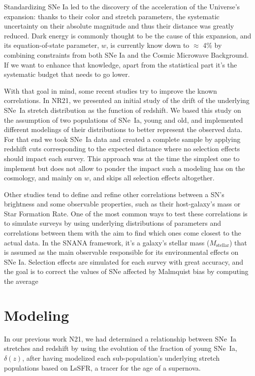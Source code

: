\documentclass[]{aa}
\begin{document}
Standardizing SNe Ia led to the discovery of the acceleration of the Universe's
expansion: thanks to their color and stretch parameters, the systematic
uncertainty on their absolute magnitude and thus their distance was greatly
reduced. Dark energy is commonly thought to be the cause of this expansion, and
its equation-of-state parameter, $w$, is currently know down to $\approx$ 4\% by
combining constraints from both SNe Ia and the Cosmic Microwave Background. If
we want to enhance that knowledge, apart from the statistical part it's the
systematic budget that needs to go lower.

With that goal in mind, some recent studies try to improve the known
correlations. In NR21, we presented an initial study of the drift of the
underlying SNe~Ia stretch distribution as the function of redshift. We based
this study on the assumption of two populations of SNe~Ia, young and old, and
implemented different modelings of their distributions to better represent the
observed data. For that end we took SNe~Ia data and created a complete sample by
applying redshift cuts corresponding to the expected distance where no selection
effects should impact each survey. This approach was at the time the
simplest one to implement but does not allow to ponder the impact such a
modeling has on the cosmology, and mainly on $w$, and skips all selection
effects altogether.

Other studies tend to define and refine other correlations between a SN's
brightness and some observable properties, such as their host-galaxy's mass or
Star Formation Rate. One of the most common ways to test these correlations is
to simulate surveys by using underlying distributions of parameters and
correlations between them with the aim to find which ones come closest to the
actual data. In the SNANA framework, it's a galaxy's stellar mass
($M_\mathrm{stellar}$) that is assumed as the main observable responsible for
its environmental effects on SNe Ia. Selection effects are simulated for each
survey with great accuracy, and the goal is to correct the values of SNe
affected by Malmquist bias by computing the average

\section{Modeling}\label{sec:model}
In our previous work N21, we had determined a relationship between SNe~Ia
stretches and redshift by using the evolution of the fraction of young SNe~Ia,
$\delta(z)$, after having modelized each sub-population's underlying stretch
populations based on LsSFR, a tracer for the age of a supernova.
\end{document}
